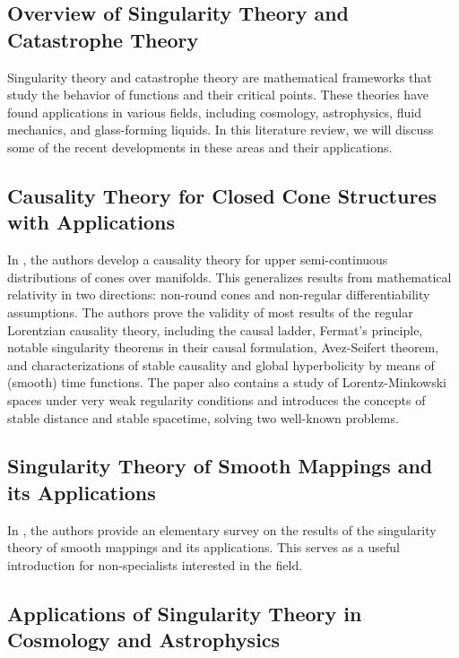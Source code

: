 \documentclass{article}
\begin{document}
\subsection{Overview of Singularity Theory and Catastrophe Theory}

Singularity theory and catastrophe theory are mathematical frameworks that study the behavior of functions and their critical points. These theories have found applications in various fields, including cosmology, astrophysics, fluid mechanics, and glass-forming liquids. In this literature review, we will discuss some of the recent developments in these areas and their applications.

\subsection{Causality Theory for Closed Cone Structures with Applications}

In \cite{Minguzzi2017CausalityTF}, the authors develop a causality theory for upper semi-continuous distributions of cones over manifolds. This generalizes results from mathematical relativity in two directions: non-round cones and non-regular differentiability assumptions. The authors prove the validity of most results of the regular Lorentzian causality theory, including the causal ladder, Fermat's principle, notable singularity theorems in their causal formulation, Avez-Seifert theorem, and characterizations of stable causality and global hyperbolicity by means of (smooth) time functions. The paper also contains a study of Lorentz-Minkowski spaces under very weak regularity conditions and introduces the concepts of stable distance and stable spacetime, solving two well-known problems.

\subsection{Singularity Theory of Smooth Mappings and its Applications}

In \cite{Izumiya2006SingularityTO}, the authors provide an elementary survey on the results of the singularity theory of smooth mappings and its applications. This serves as a useful introduction for non-specialists interested in the field.

\subsection{Applications of Singularity Theory in Cosmology and Astrophysics}
\end{document}
